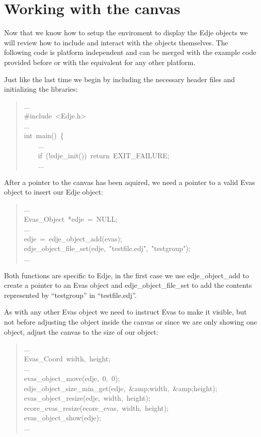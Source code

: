 \documentclass[12pt,a4paper,english]{book}
\begin{document}

\hypertarget{working-with-the-canvas}{}
\section{Working with the canvas}

Now that we know how to setup the enviroment to display the Edje objects we
will review how to include and interact with the objects themselves. The
following code is platform independent and can be merged with the example code
provided before or with the equivalent for any other platform.

Just like the last time we begin by including the necessary header files and
initializing the libraries:
\begin{quote}{\ttfamily \raggedright \noindent
...~\\
{\#}include~<Edje.h>~\\
...~\\
int~main()~{\{}~\\
~~~~...~\\
~~~~if~(!edje{\_}init())~return~EXIT{\_}FAILURE;~\\
~~~~...
}\end{quote}

After a pointer to the canvas has been aquired, we need a pointer to a valid
Evas object to insert our Edje object:
\begin{quote}{\ttfamily \raggedright \noindent
...~\\
Evas{\_}Object~*edje~=~NULL;~\\
...~\\
edje~=~edje{\_}object{\_}add(evas);~\\
edje{\_}object{\_}file{\_}set(edje,~"testfile.edj",~"testgroup");~\\
...
}\end{quote}

Both functions are specific to Edje, in the first case we use edje{\_}object{\_}add
to create a pointer to an Evas object and edje{\_}object{\_}file{\_}set to add the
contents represented by ``testgroup'' in ``testfile.edj''.

As with any other Evas object we need to instruct Evas to make it visible, but
not before adjusting the object inside the canvas or since we are only showing
one object, adjust the canvas to the size of our object:
\begin{quote}{\ttfamily \raggedright \noindent
...~\\
Evas{\_}Coord~width,~height;~\\
...~\\
evas{\_}object{\_}move(edje,~0,~0);~\\
edje{\_}object{\_}size{\_}min{\_}get(edje,~{\&}amp;width,~{\&}amp;height);~\\
evas{\_}object{\_}resize(edje,~width,~height);~\\
ecore{\_}evas{\_}resize(ecore{\_}evas,~width,~height);~\\
evas{\_}object{\_}show(edje);~\\
...
}\end{quote}
\end{document}
